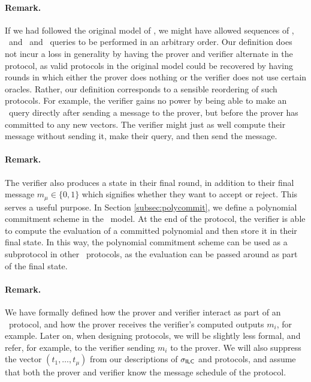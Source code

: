 \paragraph{Remark.} If we had followed the original model of \cite{BootleCGGHJ17}, we might have allowed sequences of \ILCcommit, \ILCsend\ and \ILCopen\ and \ILCcheck\ queries to be performed in an arbitrary order. Our definition does not incur a loss in generality by having the prover and verifier alternate in the protocol, as valid protocols in the original model could be recovered by having rounds in which either the prover does nothing or the verifier does not use certain oracles. Rather, our definition corresponds to a sensible reordering of such protocols. For example, the verifier gains no power by being able to make an \ILCopen\ query directly after sending a message to the prover, but before the prover has committed to any new vectors. The verifier might just as well compute their message without sending it, make their query, and then send the message.

\paragraph{Remark.} The verifier also produces a state in their final round, in addition to their final message $m_\mu \in \lbrace 0,1 \rbrace$ which signifies whether they want to accept or reject. This serves a useful purpose. In Section \ref{subsec:polycommit}, we define a polynomial commitment scheme in the \ILC\ model. At the end of the protocol, the verifier is able to compute the evaluation of a committed polynomial and then store it in their final state. In this way, the polynomial commitment scheme can be used as a subprotocol in other \ILC\ protocols, as the evaluation can be passed around as part of the final state.

\paragraph{Remark.} We have formally defined how the prover and verifier interact as part of an \ILC\ protocol, and how the prover receives the verifier's computed outputs $m_i$, for example. Later on, when designing protocols, we will be slightly less formal, and refer, for example, to the verifier sending $m_i$ to the prover. We will also suppress the vector $(t_1,\ldots,t_\mu)$ from our descriptions of $\mathsf{\sigma}_{\mathsf{ILC}}$ and protocols, and assume that both the prover and verifier know the message schedule of the protocol.

